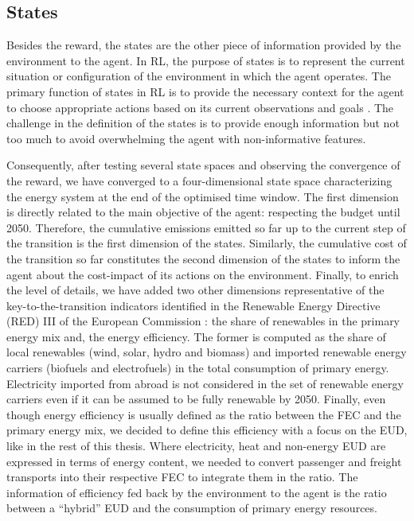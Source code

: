 \subsection{States}
\label{subsec:RL:act_states_rew:states}

Besides the reward, the states are the other piece of information provided by the environment to the agent. In \gls{RL}, the purpose of states is to represent the current situation or configuration of the environment in which the agent operates. The primary function of states in RL is to provide the necessary context for the agent to choose appropriate actions based on its current observations and goals \cite{sutton2018reinforcement}. The challenge in the definition of the states is to provide enough information but not too much to avoid overwhelming the agent with non-informative features. 

Consequently, after testing several state spaces and observing the convergence of the reward, we have converged to a four-dimensional state space characterizing the energy system at the end of the optimised time window. The first dimension is directly related to the main objective of the agent: respecting the  budget until 2050. Therefore, the cumulative emissions emitted so far up to the current step of the transition is the first dimension of the states. Similarly, the cumulative cost of the transition so far constitutes the second dimension of the states to inform the agent about the cost-impact of its actions on the environment. Finally, to enrich the level of details, we have added two other dimensions representative of the key-to-the-transition indicators identified in the Renewable Energy Directive (RED) III of the European Commission \cite{REDIII}: the share of renewables in the primary energy mix and, the energy efficiency. The former is computed as the share of local renewables (\ie wind, solar, hydro and biomass) and imported renewable energy carriers (\ie biofuels and electrofuels) in the total consumption of primary energy. Electricity imported from abroad is not considered in the set of renewable energy carriers even if it can be assumed to be fully renewable by 2050. Finally, even though energy efficiency is usually defined as the ratio between the \gls{FEC} and the primary energy mix, we decided to define this efficiency with a focus on the \gls{EUD}, like in the rest of this thesis. Where electricity, heat and non-energy \gls{EUD} are expressed in terms of energy content, we needed to convert passenger and freight transports into their respective \gls{FEC} to integrate them in the ratio. The information of efficiency fed back by the environment to the agent is the ratio between a ``hybrid'' \gls{EUD} and the consumption of primary energy resources.

